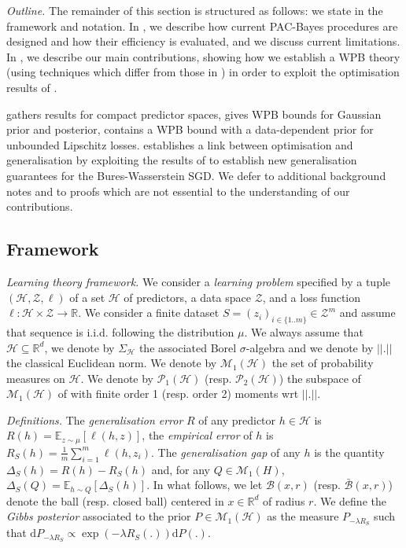 \textit{Outline.}
The remainder of this section is structured as follows: we state in  the framework and notation. In , we describe how current PAC-Bayes procedures are designed and how their efficiency is evaluated, and we discuss current limitations.
In , we describe our main contributions, showing how we establish a WPB theory (using techniques which differ from those in \citealp{amit2022integral}) in order to exploit the optimisation results of \citet{lambert2022variational}.

 gathers results for compact predictor spaces,  gives WPB bounds for Gaussian prior and posterior,  contains a WPB bound with a data-dependent prior for unbounded Lipschitz losses.  establishes a link between optimisation and generalisation by exploiting the results of \citet{lambert2022variational} to establish new generalisation guarantees for the Bures-Wasserstein SGD. We defer to  additional background notes and to  proofs which are not essential to the understanding of our contributions.


\subsection{Framework}
\label{sec: framework}

\textit{Learning theory framework.}
We consider a \emph{learning problem} specified by a tuple $(\mathcal{H}, \mathcal{Z}, \ell)$ of a set $\mathcal{H}$ of predictors, a data space $\mathcal{Z}$, and a loss function $\ell : \mathcal{H}\times \mathcal{Z} \rightarrow \mathbb{R} $.
We consider a finite dataset $S=(z_i)_{i\in \{1..m\}}\in\mathcal{Z}^{m}$ and assume that sequence is i.i.d. following the distribution $\mu$. We always assume that $\mathcal{H}\subseteq\mathbb{R}^d$, we denote by $\Sigma_{\mathcal{H}}$ the associated Borel $\sigma$-algebra and we denote by $||.||$ the classical Euclidean norm. We denote by $\mathcal{M}_1(\mathcal{H})$ the set of probability measures on $\mathcal{H}$.
We denote by $\mathcal{P}_1(\mathcal{H})$ (resp. $\mathcal{P}_2(\mathcal{H})$) the subspace of $\mathcal{M}_1(\mathcal{H})$ of with finite order 1 (resp. order 2) moments wrt $||.||$.

\textit{Definitions.}
The \emph{generalisation error} $R$ of any predictor $h\in\mathcal{H}$ is $R(h)= \mathbb{E}_{z\sim \mu}[\ell(h,z)]$, the \emph{empirical error} of $h$ is $R_S(h)= \frac{1}{m}\sum_{i=1}^m\ell(h,z_i)$.
The \emph{generalisation gap} of any $h$ is the quantity $\Delta_S(h)=R(h)-R_S(h)$ and, for any $Q\in\mathcal{M}_1(H)$, $\Delta_S(Q)= \mathbb{E}_{h\sim Q}[\Delta_S(h)]$. In what follows, we let $\mathcal{B}(x,r)$ (resp. $\bar{\mathcal{B}}(x,r)$) denote the ball (resp. closed ball) centered in $x\in\mathbb{R}^d$ of radius $r$.
We define the \emph{Gibbs posterior} associated to the prior $P\in\mathcal{M}_1(\mathcal{H})$ as the measure $P_{-\lambda R_S}$ such that $\mathrm{d}P_{-\lambda R_S} \propto \exp(-\lambda R_S(.)) \mathrm{d}P(.)$.



